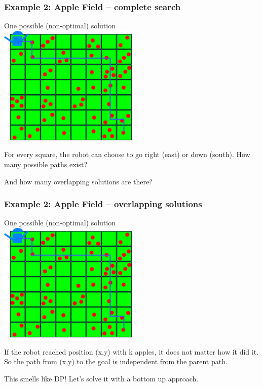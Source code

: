 \documentclass{beamer}
\begin{document}
\begin{frame}
  \frametitle{Example 2: Apple Field -- complete search}
  \begin{center}
    {\smaller One possible (non-optimal) solution}\\
    \includegraphics[width=0.5\textwidth]{../img/applefield-solution}
  \end{center}

  For every square, the robot can choose to go right (east) or down
  (south). How many possible paths exist?

  \bigskip

  And how many overlapping solutions are there?
\end{frame}

\begin{frame}
  \frametitle{Example 2: Apple Field -- overlapping solutions}
  \begin{center}
    {\smaller One possible (non-optimal) solution}\\
    \includegraphics[width=0.5\textwidth]{../img/applefield-solution}
  \end{center}

  If the robot reached position (x,y) with k apples, it does not
  matter how it did it. So the path from (x,y) to the goal is independent from
  the parent path.

  This smells like DP! Let's solve it with a bottom up approach.
\end{frame}
\end{document}
